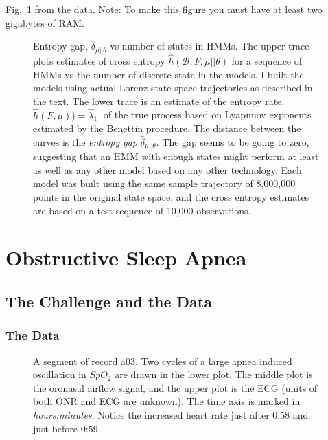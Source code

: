 \documentclass[prelim,showlabels]{book}
\begin{document}
Fig.~\ref{fig:LikeLor} from the data.  Note: To make this figure you
must have at least two gigabytes of RAM.
\begin{figure}[htbp]
  \caption[Entropy gap, $\hat
  \delta_{\mu||\theta}$ vs number of states in HMMs]%
  {Entropy gap, $\hat \delta_{\mu||\theta}$ vs number of states in
    HMMs.  The upper trace plots estimates of cross entropy $\hat
    h(\mathcal{B},F,\mu||\theta)$ for a sequence of HMMs vs the number
    of discrete state in the models.  I built the models using actual
    Lorenz state space trajectories as described in the text.  The
    lower trace is an estimate of the entropy rate, $\hat h(F,\mu)) =
    \hat \lambda_1$, of the true process based on Lyapunov exponents
    estimated by the Benettin procedure.  The distance between the
    curves is the \emph{entropy gap} $\hat \delta_{\mu||\theta}$. The
    gap seems to be going to zero, suggesting that an HMM with enough
    states might perform at least as well as any other model based on
    any other technology.  Each model was built using the same sample
    trajectory of 8,000,000 points in the original state space, and
    the cross entropy estimates are based on a test sequence of 10,000
    observations.}
  \label{fig:LikeLor}
\end{figure}

\chapter{Obstructive Sleep Apnea}
\label{chap:apnea}

\section{The  Challenge and the Data}
\label{sec:challenge}

\subsection{The Data}
\label{sec:data}
\begin{figure}
  \caption[A segment of record a03]%
  {A segment of record a03.  Two cycles of a large apnea
    induced oscillation in $SpO_2$ are drawn in the lower plot.  The
    middle plot is the oronasal airflow signal, and the upper plot is
    the ECG (units of both ONR and ECG are unknown).  The time
    axis is marked in \emph{hours:minutes}.  Notice the increased
    heart rate just after 0:58 and just before 0:59.}
  \label{fig:a03erA}
\end{figure}
\end{document}
